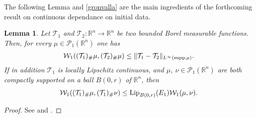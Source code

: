 \documentclass[A4paper,11pt]{article}
\newtheorem{lemma}[theorem]{Lemma}
\theoremstyle{definition}
\newcommand{\Lip}{\textup{Lip}}
\newcommand{\R}{\mathbb{R}}
\newcommand{\W}{\mathcal{W}}
\newcommand{\PP}{\mathcal{P}_1}
\DeclareMathOperator{\supp}{supp}
\begin{document}

The following Lemma and \eqref{gronvalla} are the main ingredients of the forthcoming result on continuous dependance on initial data.

\begin{lemma}\label{primstim}
Let $\mathcal{T}_1$ and $\mathcal{T}_2 \colon \R^n \to \R^n$ be two bounded Borel measurable functions. Then, for every $\mu \in \PP(\R^n)$ one has
\begin{align*}
\W_1((\mathcal{T}_1)_{\#}\mu, (\mathcal{T}_2)_{\#} \mu) \le \|\mathcal{T}_1-\mathcal{T}_2\|_{L^\infty({\rm supp}\,\mu)}.
\end{align*}
If in addition $\mathcal{T}_1$ is locally Lipschitz continuous, and $\mu$, $\nu \in \PP(\R^n)$ are both compactly supported on a ball $B(0,r)$ of $\R^n$, then
\begin{align*}
\W_1((\mathcal{T}_1)_{\#} \mu, (\mathcal{T}_1)_{\#} \nu) \le \Lip_{B(0,r)}(E_1) \W_1(\mu, \nu).
\end{align*}
\end{lemma}

\begin{proof}
See \cite[Lemma 3.11]{CanCarRos10} and \cite[Lemma 3.13]{CanCarRos10}.
\end{proof}

%
\end{document}

